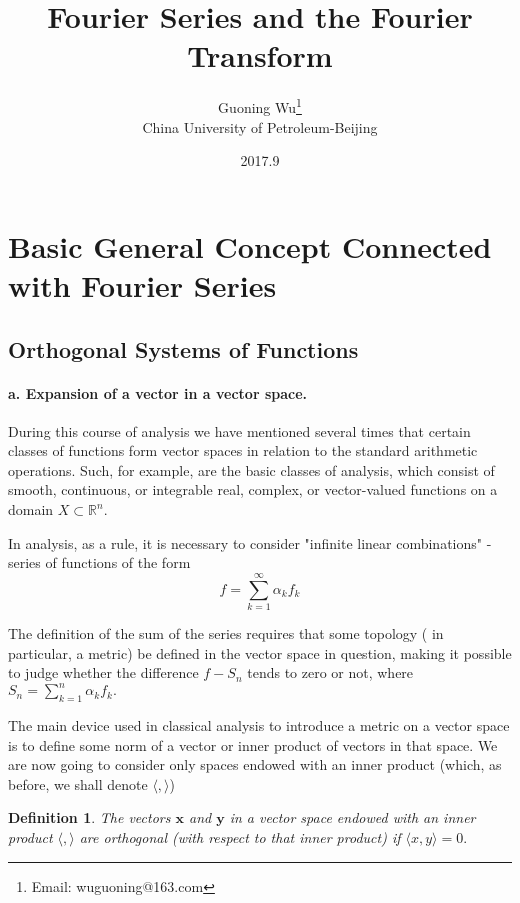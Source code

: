 \documentclass[a4paper,12pt]{article}
\newtheorem{definition}{Definition}[section]
\begin{document}
\title{Fourier Series and the Fourier Transform}
\author{Guoning Wu\footnote{Email: wuguoning@163.com}\\[2ex]
 China University of Petroleum-Beijing\\[2ex]}
\date{2017.9}
\maketitle
\section{Basic General Concept Connected with Fourier Series}

\subsection{Orthogonal Systems of Functions}
    \paragraph{\rm \textbf{a. Expansion of a vector in a vector space.}}
    During this course of analysis we have mentioned several times that 
    certain classes of functions form vector spaces in relation to the 
    standard arithmetic operations. Such, for example, are the basic 
    classes of analysis, which consist of smooth, continuous, or integrable 
    real, complex, or vector-valued functions on a domain $X \subset \mathbb{R}^n$.

    In analysis, as a rule, it is necessary to consider "infinite linear
    combinations" - series of functions of the form
    \[
        f = \sum_{k=1}^{\infty}\alpha_k f_k
    \]
    
    The definition of the sum of the series requires that some topology (
    in particular, a metric) be defined in the vector space in question, 
    making it possible to judge whether the difference $f - S_n$ tends to 
    zero or not, where $S_n = \sum_{k=1}^{n}\alpha_kf_k.$

    The main device used in classical analysis to introduce a metric on
    a vector space is to define some norm of a vector or inner product
    of vectors in that space. We are now going to consider only spaces 
    endowed with an inner product (which, as before, we shall denote 
    $\langle, \rangle$)

    \begin{definition}
        \emph{
        The vectors $\bm{x}$ and $\bm{y}$ in a vector space endowed with an 
        inner product $\langle, \rangle$ are orthogonal (with respect to 
        that inner product) if $\langle x, y \rangle = 0.$
        }
    \end{definition}
\end{document}
